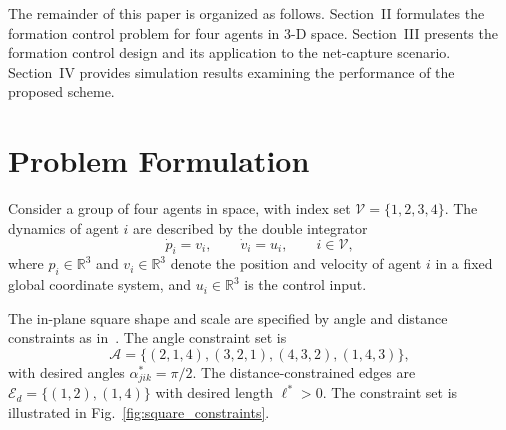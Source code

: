 \documentclass[letterpaper,journal]{IEEEtran}
\theoremstyle{plain}
\theoremstyle{definition}
\theoremstyle{remark}
\begin{document}

The remainder of this paper is organized as follows. Section~II formulates the formation control problem for four agents in 3-D space. Section~III presents the formation control design and its application to the net-capture scenario. Section~IV provides simulation results examining the performance of the proposed scheme.



\section{Problem Formulation}

Consider a group of four agents in space, with index set \(\mathcal V=\{1,2,3,4\}\).
The dynamics of agent \(i\) are described by the double integrator
\begin{equation}
\label{eq:agent-dynamics}
\dot p_i = v_i,\qquad
\dot v_i = u_i,
\qquad i\in\mathcal V,
\end{equation}
where \(p_i\in\mathbb R^3\) and \(v_i\in\mathbb R^3\) denote the position and velocity of agent \(i\) in a fixed global coordinate system, and \(u_i\in\mathbb R^3\) is the control input.

The in-plane square shape and scale are specified by angle and distance constraints as in~\cite{li2025localInfo}. The angle constraint set is
\begin{equation}
\label{eq:angle-set}
\mathcal A=\{(2,1,4),(3,2,1),(4,3,2),(1,4,3)\},
\end{equation}
with desired angles \(\alpha_{jik}^*=\pi/2\). The distance-constrained edges are \(\mathcal E_d=\{(1,2),(1,4)\}\) with desired length \(\ell^*>0\). The constraint set is illustrated in Fig.~\ref{fig:square_constraints}.
\end{document}
